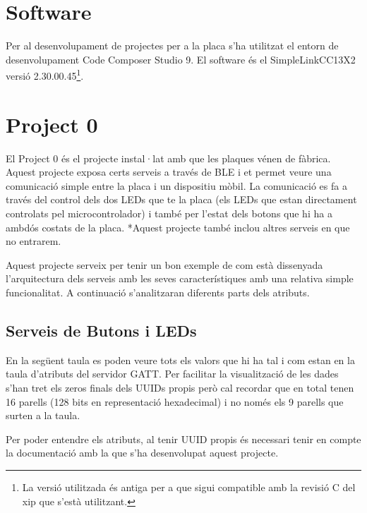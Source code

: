 \section{Software}
Per al desenvolupament de projectes per a la placa s'ha utilitzat el entorn de desenvolupament Code Composer Studio 9. El software és el SimpleLink\texttrademark CC13X2 versió 2.30.00.45\footnote{La versió utilitzada és antiga per a que sigui compatible amb la revisió C del xip que s'està utilitzant.}.

\section{Project 0}
El Project 0 és el projecte instal·lat amb que les plaques vénen de fàbrica. Aquest projecte exposa certs serveis a través de BLE i et permet veure una comunicació simple entre la placa i un dispositiu mòbil.
La comunicació es fa a través del control dels dos LEDs que te la placa (els LEDs que estan directament controlats pel microcontrolador) i també per l'estat dels botons que hi ha a ambdós costats de la placa.
*Aquest projecte també inclou altres serveis en que no entrarem.

Aquest projecte serveix per tenir un bon exemple de com està dissenyada l'arquitectura dels serveis amb les seves característiques amb una relativa simple funcionalitat. A continuació s'analitzaran diferents parts dels atributs.

\subsection{Serveis de Butons i LEDs}

En la següent taula es poden veure tots els valors que hi ha tal i com estan en la taula d'atributs del servidor GATT.
Per facilitar la visualització de les dades s'han tret els zeros finals dels UUIDs propis però cal recordar que en total tenen 16 parells (128 bits en representació hexadecimal) i no només els 9 parells que surten a la taula.

\begin{center}
	\begin{table}[h!]
	\end{table}
\end{center}

Per poder entendre els atributs, al tenir UUID propis és necessari tenir en compte la documentació amb la que s'ha desenvolupat aquest projecte.

